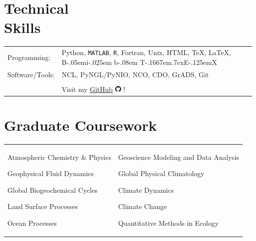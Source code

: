 \documentclass[margin,line,palatino,courier,10pt]{res}
\def\BibTeX{{\rm B\kern-.05em{\sc i\kern-.025em b}\kern-.08em
    T\kern-.1667em\lower.7ex\hbox{E}\kern-.125emX}}
\newenvironment{list1}{
  \begin{list}{\ding{113}}{%
      \setlength{\itemsep}{0in}
      \setlength{\parsep}{0in} \setlength{\parskip}{0in}
      \setlength{\topsep}{0in} \setlength{\partopsep}{0in}
      \setlength{\leftmargin}{0.17in}}}{\end{list}}
\begin{document}
\begin{resume}
\section{\sc \textcolor{Cerulean}{\large{\textbf{Technical \\ Skills}}}}
\vspace*{0.05in}
\begin{tabular}{@{}p{0.9in}p{6in}}

Programming:& Python, \texttt{MATLAB}, \texttt{R}, Fortran, Unix, HTML, \TeX, \LaTeX, \BibTeX \\
Software/Tools: & NCL, PyNGL/PyNIO, NCO, CDO, GrADS, Git\\\\

& Visit my \href{https://github.com/zmlabe}{GitHub} \includegraphics[height=9pt]{github.png} !\\
\end{tabular}

\noindent\textcolor{Cerulean}{\makebox[\linewidth][r]{\rule{\textwidth}{5pt}}}
\section{\sc \textcolor{Cerulean}{\large{\textbf{Graduate Coursework}}}}
\vspace{-0.3in}
\begin{tabular}{@{}p{2.2in}p{3in}}
\begin{list1}
\item Atmospheric Chemistry \& Physics 
\item Geophysical Fluid Dynamics
\item Global Biogeochemical Cycles
\item Land Surface Processes
\item Ocean Processes
\end{list1}
&
\begin{list1}
\item Geoscience Modeling and Data Analysis
\item Global Physical Climatology
\item Climate Dynamics
\item Climate Change
\item Quantitative Methods in Ecology
\end{list1}
\end{tabular}


\end{resume}
\end{document}
